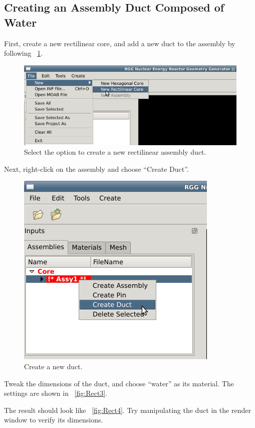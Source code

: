 \subsection{Creating an Assembly Duct Composed of Water}

First, create a new rectilinear core, and add a new duct to the assembly by following ~\ref{fig:Rect1}.

\begin{figure}[htb]
\begin{center}
\includegraphics[width=0.5\linewidth]{Images/rect-1e1.png}
\caption{Select the option to create a new rectilinear assembly duct.}
\label{fig:Rect1}
\end{center}
\end{figure}

Next, right-click on the assembly and choose ``Create Duct''.

\begin{figure}[htb]
\begin{center}
\includegraphics[width=0.5\linewidth]{Images/rect-2e1.png}
\caption{Create a new duct.}
\label{fig:Rect2}
\end{center}
\end{figure}

Tweak the dimensions of the duct, and choose ``water'' as its material.  The settings are shown in ~\ref{fig:Rect3}.

The result should look like ~\ref{fig:Rect4}.  Try manipulating the duct in the render window to verify its dimensions.

